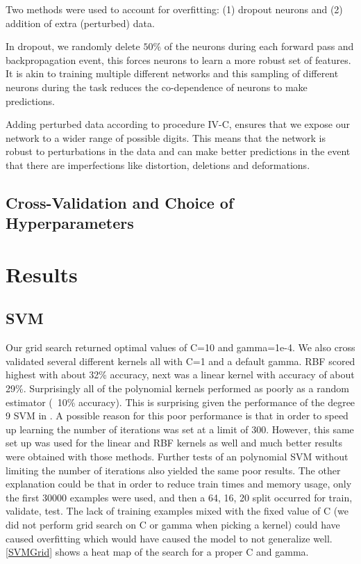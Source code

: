\documentclass[conference]{IEEEtran}
\begin{document}
Two methods were used to account for overfitting: (1) dropout\cite{dropout} neurons and (2) addition of extra (perturbed) data. 

In dropout, we randomly delete $50\%$ of the neurons during each forward pass and backpropagation event, this forces neurons to learn a more robust set of features. It is akin to training multiple different networks and this sampling of different neurons during the task reduces the co-dependence of neurons to make predictions. 

Adding perturbed data according to procedure IV-C, ensures that we expose our network to a wider range of possible digits. This means that the network is robust to perturbations in the data and can make better predictions in the event that there are imperfections like distortion, deletions and deformations.

\subsection{Cross-Validation and Choice of Hyperparameters}

\section{Results}
\subsection{SVM}
Our grid search returned optimal values of C=10 and gamma=1e-4. We also cross validated several different kernels all with C=1 and a default gamma. RBF scored highest with about 32\% accuracy, next was a linear kernel with accuracy of about 29\%. Surprisingly all of the polynomial kernels performed as poorly as a random estimator (~10\% accuracy). This is surprising given the performance of the degree 9 SVM in \cite{LeCunn98}. A possible reason for this poor performance is that in order to speed up learning the number of iterations was set at a limit of 300. However, this same set up was used for the linear and RBF kernels as well and much better results were obtained with those methods. Further tests of an polynomial SVM without limiting the number of iterations also yielded the same poor results. The other explanation could be that in order to reduce train times and memory usage, only the first 30000 examples were used, and then a 64, 16, 20 split occurred for train, validate, test. The lack of training examples mixed with the fixed value of C (we did not perform grid search on C or gamma when picking a kernel) could have caused overfitting which would have caused the model to not generalize well. \ref{SVMGrid} shows a heat map of the search for a proper C and gamma. 
\end{document}
